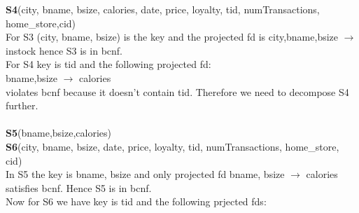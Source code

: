 \documentclass{article}
\begin{document}
\begin{enumerate}
	  \textbf{S4}(city, bname, bsize, calories, date, price, loyalty, tid, numTransactions, home\_store,cid)\\
	  For S3 (city, bname, bsize) is the key and the projected fd is city,bname,bsize $\rightarrow$ instock
	  hence S3 is in bcnf.\\
	  For S4 key is tid and the following projected fd:\\
		bname,bsize $\rightarrow$ calories\\
		violates bcnf because it doesn't contain tid. Therefore we need to decompose S4 further.\\\\
	  \textbf{S5}(bname,bsize,calories)\\
	  \textbf{S6}(city, bname, bsize, date, price, loyalty, tid, numTransactions, home\_store, cid)\\
	  In S5 the key is bname, bsize and only projected fd bname, bsize $\rightarrow$ calories satisfies bcnf. Hence
	  S5 is in bcnf.\\
	  Now for S6 we have key is tid and the following prjected fds:
		

\end{enumerate}
\end{document}
